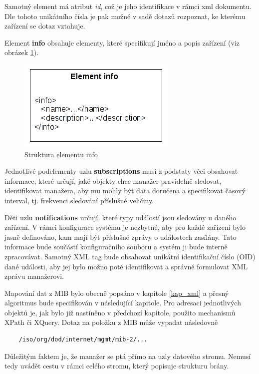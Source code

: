 Samotný element má atribut \textit{id}, což je jeho identifikace v rámci xml dokumentu. Dle tohoto unikátního čísla je pak možné
v sadě dotazů rozpoznat, ke kterému zařízení se dotaz vztahuje.


Element \textbf{info} obsahuje elementy, které specifikují jméno a popis zařízení (viz obrázek \ref{obr_an_info_element}).

\begin{figure}[htp]
	\begin{center}
		\includegraphics{obrazky/04_element_info.png}
		\caption{Struktura elementu info}
		\label{obr_an_info_element}
	\end{center}
\end{figure}

Jednotlivé podelementy uzlu \textbf{subscriptions} musí z podstaty věci obsahovat informace, které určují, jaké objekty chce manažer pravidelně sledovat, identifikovat
manažera, aby mu mohly být data doručena a specifikovat časový interval, tj. frekvenci sledování příslušné veličiny.

Děti uzlu \textbf{notifications} určují, které typy událostí jsou sledovány u daného zařízení. V rámci konfigurace systému je nezbytné, aby pro každé zařízení
bylo jasně definováno, kam mají být příslušné zprávy o událostech zasílány. Tato informace bude součástí konfiguračního souboru a systém ji bude
interně zpracovávat. Samotný XML tag bude obsahovat unikátní identifikační číslo (OID) dané události, aby jej bylo možno poté identifikovat a správně formulovat
XML zprávu manažerovi.

Mapování dat z MIB bylo obecně popsáno v kapitole \ref{kap_xml} a přesný algoritmus bude specifikován v následující kapitole. Pro adresaci jednotlivých objektů
je, jak bylo již nastíněno v předchozí kapitole, použito mechanismů XPath či XQuery. Dotaz na položku z MIB může vypadat následovně
\begin{verbatim}
	/iso/org/dod/internet/mgmt/mib-2/...
\end{verbatim}

Důležitým faktem je, že manažer se ptá přímo na uzly datového stromu. Nemusí tedy uvádět cestu v rámci celého stromu, který popisuje strukturu brány.

